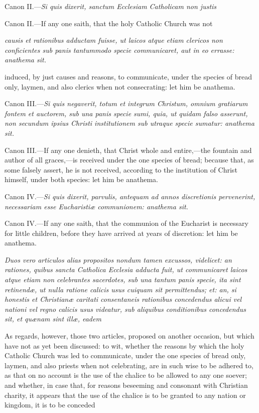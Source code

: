 Canon II.—\emph{Si quis dixerit, sanctum Ecclesiam Catholicam non justis }

Canon II.—If any one saith, that the holy Catholic Church was not

\emph{causis et rationibus adductam fuisse, ut laicos atque etiam clericos non conficientes sub panis tantummodo specie communicaret, aut in eo errasse: anathema sit.}

induced, by just causes and reasons, to communicate, under the species of bread only, laymen, and also clerics when not consecrating: let him be anathema.

Canon III.—\emph{Si quis negaverit, totum et integrum Christum, omnium gratiarum fontem et auctorem, sub una panis specie sumi, quia, ut quidam falso asserunt, non secundum ipsius Christi institutionem sub utraque specie sumatur: anathema sit.}

Canon III.—If any one denieth, that Christ whole and entire,—the fountain and author of all graces,—is received under the one species of bread; because that, as some falsely assert, he is not received, according to the institution of Christ himself, under both species: let him be anathema.

Canon IV.—\emph{Si quis dixerit, parvulis, antequam ad annos discretionis pervenerint, necessariam esse Eucharistiæ communionem: anathema sit.}

Canon IV.—If any one saith, that the communion of the Eucharist is necessary for little children, before they have arrived at years of discretion: let him be anathema.

\emph{Duos vero articulos alias propositos nondum tamen excussos, videlicet: an rationes, quibus sancta Catholica Ecclesia adducta fuit, ut communicaret laicos atque etiam non celebrantes sacerdotes, sub una tantum panis specie, ita sint retinendæ, ut nulla ratione calicis usus cuiquam sit permittendus; et: an, si honestis et Christianæ caritati consentaneis rationibus concedendus alicui vel nationi vel regno calicis usus videatur, sub aliquibus conditionibus concedendus sit, et quænam sint illæ, eadem }

As regards, however, those two articles, proposed on another occasion, but which have not as yet been discussed: to wit, whether the reasons by which the holy Catholic Church was led to communicate, under the one species of bread only, laymen, and also priests when not celebrating, are in such wise to be adhered to, as that on no account is the use of the chalice to be allowed to any one soever; and whether, in case that, for reasons beseeming and consonant with Christian charity, it appears that the use of the chalice is to be granted to any nation or kingdom, it is to be conceded

